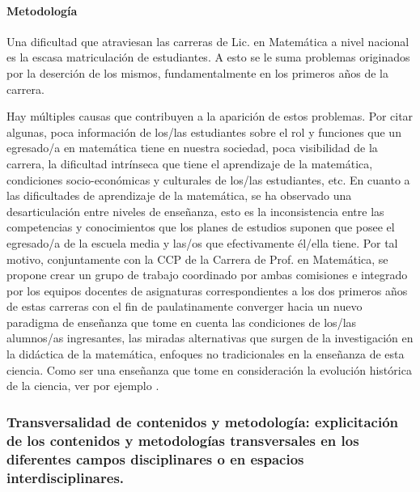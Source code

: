 \documentclass[a4paper, 12pt]{article}
\begin{document}
\paragraph{Metodología}


Una dificultad que atraviesan las carreras de Lic. en Matemática a nivel nacional es la escasa matriculación de estudiantes. A esto se le suma problemas originados por la deserción de los mismos, fundamentalmente en los primeros años de la carrera. 


Hay múltiples causas que contribuyen a la aparición de estos problemas. Por citar algunas, poca información de los/las estudiantes sobre el rol y funciones que un egresado/a en matemática tiene en nuestra sociedad, poca visibilidad de la carrera, la dificultad intrínseca que tiene el aprendizaje de la matemática, condiciones socio-económicas y culturales de los/las estudiantes, etc.
\newline
En cuanto a las dificultades de aprendizaje de la matemática, se ha observado una desarticulación entre niveles de enseñanza, esto es la inconsistencia entre  las competencias y conocimientos que los planes de estudios suponen que posee  el    egresado/a de la escuela media  y las/os que efectivamente él/ella tiene.
\newline
Por tal motivo, conjuntamente con la CCP de la Carrera de Prof. en Matemática, se propone crear un grupo de trabajo coordinado por ambas comisiones e integrado por los equipos docentes de asignaturas correspondientes a los dos primeros años de estas carreras con el fin de paulatinamente converger hacia un nuevo paradigma de enseñanza que tome en cuenta las condiciones de los/las alumnos/as ingresantes, las  miradas alternativas que surgen de la investigación en la didáctica de la matemática, enfoques no tradicionales en la enseñanza  de esta ciencia. Como ser una enseñanza que tome en consideración la evolución histórica de la ciencia, ver por ejemplo  \cite{DavidM.Bressoud121,StephenAbbott134,ErnstHairer633,DavidApplebaum639,OttoToeplitz642,DavidBressoud643,DavidM.Bressoud651,DavidM.Bressoud688}.




\subsubsection{Transversalidad de contenidos y metodología: explicitación de los contenidos y metodologías transversales en los diferentes campos disciplinares o en espacios interdisciplinares.}
\end{document}
